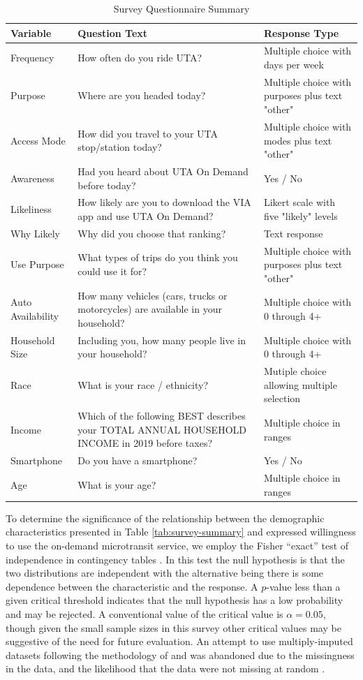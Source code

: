 \documentclass[smartcities,article,submit,moreauthors,pdftex]{mdpi}
\begin{document}
\begin{table}

\caption{\label{tab:survey-questions}Survey Questionnaire Summary}
\centering
\begin{tabular}[t]{lp{}p{}}
\toprule
Variable & Question Text & Response Type\\
\midrule
Frequency & How often do you ride UTA? & Multiple choice with days per week\\
Purpose & Where are you headed today? & Multiple choice with purposes plus text "other"\\
Access Mode & How did you travel to your UTA stop/station today? & Multiple choice with modes plus text "other"\\
Awareness & Had you heard about UTA On Demand before today? & Yes / No\\
Likeliness & How likely are you to download the VIA app and use UTA On Demand? & Likert scale with five "likely" levels\\
\addlinespace
Why Likely & Why did you choose that ranking? & Text response\\
Use Purpose & What types of trips do you think you could use it for? & Multiple choice with purposes plus text "other"\\
Auto Availability & How many vehicles (cars, trucks or motorcycles) are available in your household? & Multiple choice with 0 through 4+\\
Household Size & Including you, how many people live in your household? & Multiple choice with 0 through 4+\\
Race & What is your race / ethnicity? & Mutiple choice allowing multiple selection\\
\addlinespace
Income & Which of the following BEST describes your TOTAL ANNUAL HOUSEHOLD INCOME in 2019 before taxes? & Multiple choice in ranges\\
Smartphone & Do you have a smartphone? & Yes / No\\
Age & What is your age? & Multiple choice in ranges\\
\bottomrule
\end{tabular}
\end{table}

To determine the significance of the relationship between the demographic
characteristics presented in Table \ref{tab:survey-summary} and expressed
willingness to use the on-demand microtransit service, we employ the Fisher
``exact'' test of independence in contingency tables \citep{fisherExact}. In this
test the null hypothesis is that the two distributions are independent with the
alternative being there is some dependence between the characteristic and the
response. A \(p\)-value less than a given critical threshold indicates that the
null hypothesis has a low probability and may be rejected. A conventional value
of the critical value is \(\alpha=0.05\), though given the small sample sizes in
this survey other critical values may be suggestive of the need for future
evaluation. An attempt to use multiply-imputed datasets following the
methodology of \citet{mice2011} and \citet{LichtThesis} was abandoned due to the
missingness in the data, and the likelihood that the data were not missing at
random \citep{jakobsen2017}.
\end{document}
